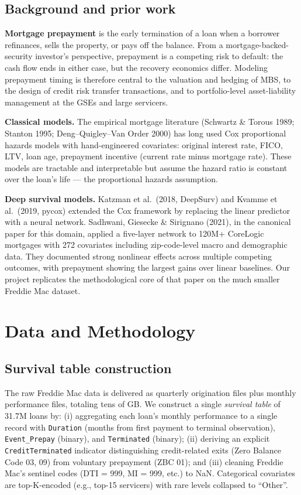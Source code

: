 \documentclass[11pt,a4paper]{article}
\begin{document}
\subsection{Background and prior work}

\textbf{Mortgage prepayment} is the early termination of a loan when a borrower refinances, sells the property, or pays off the balance. From a mortgage-backed-security investor's perspective, prepayment is a competing risk to default: the cash flow ends in either case, but the recovery economics differ. Modeling prepayment timing is therefore central to the valuation and hedging of MBS, to the design of credit risk transfer transactions, and to portfolio-level asset-liability management at the GSEs and large servicers.

\textbf{Classical models.} The empirical mortgage literature (Schwartz \& Torous 1989; Stanton 1995; Deng--Quigley--Van Order 2000) has long used Cox proportional hazards models with hand-engineered covariates: original interest rate, FICO, LTV, loan age, prepayment incentive (current rate minus mortgage rate). These models are tractable and interpretable but assume the hazard ratio is constant over the loan's life --- the proportional hazards assumption.

\textbf{Deep survival models.} Katzman et al.\ (2018, DeepSurv) and Kvamme et al.\ (2019, pycox) extended the Cox framework by replacing the linear predictor with a neural network. Sadhwani, Giesecke \& Sirignano (2021), in the canonical paper for this domain, applied a five-layer network to 120M+ CoreLogic mortgages with 272 covariates including zip-code-level macro and demographic data. They documented strong nonlinear effects across multiple competing outcomes, with prepayment showing the largest gains over linear baselines. Our project replicates the methodological core of that paper on the much smaller Freddie Mac dataset.

\section{Data and Methodology}

\subsection{Survival table construction}

The raw Freddie Mac data is delivered as quarterly origination files plus monthly performance files, totaling tens of GB. We construct a single \emph{survival table} of 31.7M loans by:
(i) aggregating each loan's monthly performance to a single record with \texttt{Duration} (months from first payment to terminal observation), \texttt{Event\_Prepay} (binary), and \texttt{Terminated} (binary);
(ii) deriving an explicit \texttt{CreditTerminated} indicator distinguishing credit-related exits (Zero Balance Code 03, 09) from voluntary prepayment (ZBC 01); and
(iii) cleaning Freddie Mac's sentinel codes (DTI = 999, MI = 999, etc.) to NaN.
Categorical covariates are top-K-encoded (e.g., top-15 servicers) with rare levels collapsed to ``Other''.
\end{document}
